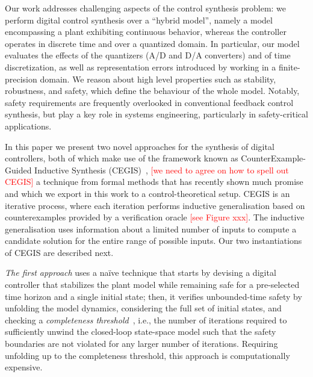 \documentclass[twocolumn]{autart}    %
\renewcommand{\note}[1]{\textcolor{red}{[#1]}}
\begin{document}
Our work addresses challenging aspects of the control synthesis problem:  
we perform digital control synthesis over a ``hybrid model'',
namely a model encompassing a plant exhibiting continuous behavior, 
whereas the controller operates in discrete time and over a quantized domain.  
In particular, our model evaluates the effects of the quantizers (A/D and D/A
converters) and of time discretization, as well as representation
errors introduced by working  %
in a finite-precision domain. 
We reason about high level properties such as stability, robustness, and safety, which define the
behaviour of the whole model.  
Notably, safety requirements are frequently overlooked in conventional feedback control synthesis, but
play a key role in systems engineering, particularly in safety-critical applications.  

In this paper we present two novel approaches for the synthesis of
digital controllers, both of which make use of the framework known as CounterExample-Guided
Inductive Synthesis (CEGIS)~\cite{jha-icse10,
  DBLP:conf/asplos/Solar-LezamaTBSS06}, 
  \note{we need to agree on how to spell out CEGIS}
a technique from formal methods that has recently shown much promise and which we export in this work to a control-theoretical setup.  
CEGIS is an iterative process, where each iteration performs inductive
generalisation based on counterexamples provided by a verification
oracle \note{see Figure xxx}. The inductive generalisation uses information 
about a limited number of inputs to compute a candidate solution
for the entire range of possible inputs. Our two instantiations of CEGIS are described next.


\emph{The first approach} uses a na\"ive technique that starts by devising a
digital controller that stabilizes the plant model while remaining safe for a
pre-selected time horizon and a single initial state; then, it verifies
unbounded-time safety by unfolding the model dynamics, considering the 
full set of initial states, and checking a \emph{completeness
threshold}~\cite{DBLP:conf/vmcai/KroeningS03}, i.e., the number of
iterations required to sufficiently unwind the closed-loop state-space
model such that the safety boundaries are not violated for any larger number of
iterations.  Requiring unfolding up to the completeness threshold, this
approach is computationally expensive.
\end{document}
